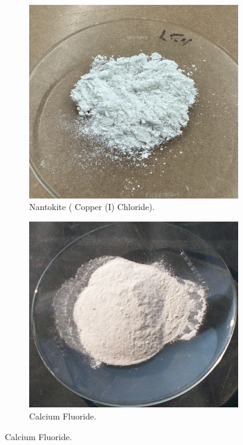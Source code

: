 \documentclass{article}
\begin{document}
\begin{figure}[h]
\begin{subfigure}{0.45\textwidth}
		\includegraphics[width=\textwidth]{Figures/CuCl.jpg}
		\caption{Nantokite ( Copper (I) Chloride). \cite{keresluna_2023_copper}}
		\label{fig:Nantokite}
	\end{subfigure}
	\vfill
	\begin{subfigure}{0.45\textwidth}
		\centering
		\includegraphics[width=\textwidth]{Figures/CaF2.jpg}
		\caption{Calcium Fluoride. \cite{june2005_2005_calcium}}
		\label{fig:CaF2}
	\end{subfigure}
	\label{fig:UnknownPowders}
\end{figure}
\end{document}
